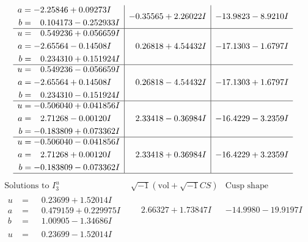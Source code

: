 \documentclass[1p]{elsarticle_modified}
\theoremstyle{definition}
\newcommand{\I}{\sqrt{-1}}
\begin{document}
$$\begin{array}{c|c|c}
\begin{aligned}
a &= -2.25846 + 0.09273 I \\
b &= \phantom{-}0.104173 - 0.252933 I\end{aligned}
 & -0.35565 + 2.26022 I & -13.9823 - 8.9210 I \\ \hline\begin{aligned}
u &= \phantom{-}0.549236 + 0.056659 I \\
a &= -2.65564 - 0.14508 I \\
b &= \phantom{-}0.234310 + 0.151924 I\end{aligned}
 & \phantom{-}0.26818 + 4.54432 I & -17.1303 - 1.6797 I \\ \hline\begin{aligned}
u &= \phantom{-}0.549236 - 0.056659 I \\
a &= -2.65564 + 0.14508 I \\
b &= \phantom{-}0.234310 - 0.151924 I\end{aligned}
 & \phantom{-}0.26818 - 4.54432 I & -17.1303 + 1.6797 I \\ \hline\begin{aligned}
u &= -0.506040 + 0.041856 I \\
a &= \phantom{-}2.71268 - 0.00120 I \\
b &= -0.183809 + 0.073362 I\end{aligned}
 & \phantom{-}2.33418 - 0.36984 I & -16.4229 - 3.2359 I \\ \hline\begin{aligned}
u &= -0.506040 - 0.041856 I \\
a &= \phantom{-}2.71268 + 0.00120 I \\
b &= -0.183809 - 0.073362 I\end{aligned}
 & \phantom{-}2.33418 + 0.36984 I & -16.4229 + 3.2359 I\\
 \hline 
 \end{array}$$\newpage$$\begin{array}{c|c|c}  
\text{Solutions to }I^u_{3}& \I (\text{vol} + \sqrt{-1}CS) & \text{Cusp shape}\\
 \hline 
\begin{aligned}
u &= \phantom{-}0.23699 + 1.52014 I \\
a &= \phantom{-}0.479159 + 0.229975 I \\
b &= \phantom{-}1.00905 - 1.34686 I\end{aligned}
 & \phantom{-}2.66327 + 1.73847 I & -14.9980 - 19.9197 I \\ \hline\begin{aligned}
u &= \phantom{-}0.23699 - 1.52014 I \\

\end{aligned}
\end{array}$$
\end{document}
